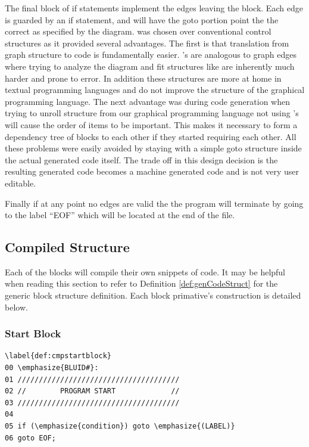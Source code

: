 The final block of if statements implement the edges leaving the block. 
Each edge is guarded by an if statement, and will have the goto portion 
point the the correct  as specified by the diagram. 
 was chosen over conventional control structures as it
provided several advantages. The first is that translation from graph 
structure to code is fundamentally easier. 's are analogous 
to graph edges where trying to analyze the diagram and fit structures 
like   are inherently much harder and 
prone to error. In addition these structures are more at home in textual 
programming languages and do not improve the structure of the 
graphical programming language. The next advantage was during code 
generation when trying to unroll structure from our graphical programming language 
not using 's will cause the order of items to be important. This
makes it necessary to form a dependency tree of blocks to each other if they 
started requiring each other. All these problems were easily avoided by staying 
with a simple goto structure inside the actual 
generated  code itself. The trade off in this 
design decision is the resulting generated code becomes a machine 
generated code and is not very user editable. 

Finally if at any point no edges are valid the the program will 
terminate by going to the label ``EOF'' which will be located 
at the end of the file.


\subsection{Compiled Structure}
\label{compiler}

Each of the blocks will compile their own snippets of code. 
It may be helpful when reading this section to refer to 
Definition \ref{def:genCodeStruct} for the generic block 
structure definition. Each block primative's construction
is detailed below.

\subsubsection{Start Block}

\begin{lstlisting}[frame=single]
\label{def:cmpstartblock}
00 \emphasize{BLUID#}:
01 //////////////////////////////////////
02 //        PROGRAM START             //
03 //////////////////////////////////////
04 
05 if (\emphasize{condition}) goto \emphasize{(LABEL)}
06 goto EOF;
\end{lstlisting}

